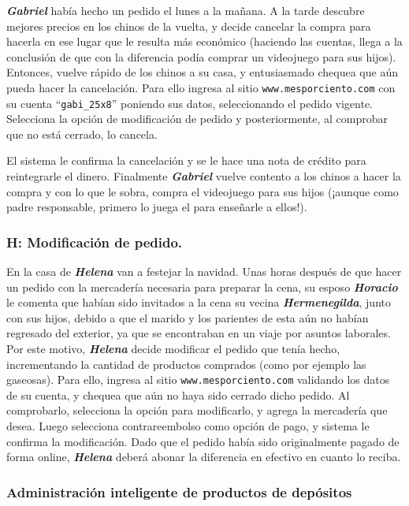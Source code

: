 \textbf{\emph{Gabriel}} había hecho un pedido el lunes a la mañana. A la tarde
descubre mejores precios en los chinos de la vuelta, y decide cancelar la compra
para hacerla en ese lugar que le resulta más económico (haciendo las cuentas,
llega a la conclusión de que con la diferencia podía comprar un videojuego para
sus hijos). Entonces, vuelve rápido de los chinos a su casa, y entusiasmado
chequea que aún pueda hacer la cancelación. Para ello ingresa al sitio
\texttt{www.mesporciento.com} con su cuenta ``\texttt{gabi\_25x8}'' poniendo sus
datos, seleccionando el pedido vigente. Selecciona la opción de modificación de
pedido y posteriormente, al comprobar que no está cerrado, lo cancela.

El sistema le confirma la cancelación y se le hace una nota de crédito para reintegrarle el dinero. Finalmente 
\textbf{\emph{Gabriel}} vuelve contento a los chinos a hacer la compra y con lo que le sobra, compra el
videojuego para sus hijos (¡aunque como padre responsable, primero lo juega el para enseñarle a ellos!).

\subsubsection{H: Modificación de pedido.}

En la casa de \textbf{\emph{Helena}} van a festejar la navidad. Unas horas
después de que hacer un pedido con la mercadería necesaria para preparar la
cena, su esposo \textbf{\emph{Horacio}} le comenta que habían sido invitados a
la cena su vecina \textbf{\emph{Hermenegilda}}, junto con sus hijos, debido a
que el marido y los parientes de esta aún no habían regresado del exterior, ya
que se encontraban en un viaje por asuntos laborales. Por este motivo,
\textbf{\emph{Helena}} decide modificar el pedido que tenía hecho, incrementando
la cantidad de productos comprados (como por ejemplo las gaseosas). Para ello,
ingresa al sitio \texttt{www.mesporciento.com} validando los datos de su cuenta,
y chequea que aún no haya sido cerrado dicho pedido. Al comprobarlo, selecciona
la opción para modificarlo, y agrega la mercadería que desea. Luego selecciona
contrareembolso como opción de pago, y sistema le confirma la modificación. Dado
que el pedido había sido originalmente pagado de forma online,
\textbf{\emph{Helena}} deberá abonar la diferencia en efectivo en cuanto lo
reciba.

\subsubsection{Administración inteligente de productos de depósitos}

